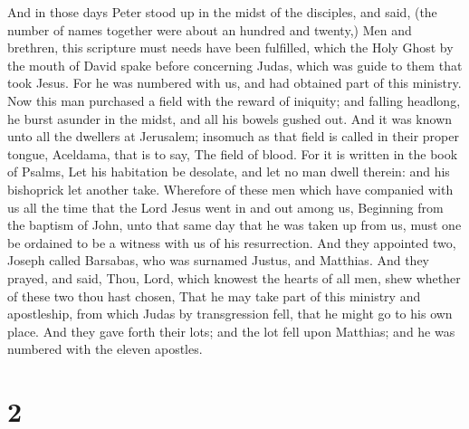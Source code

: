  And in those days Peter stood up in the midst of the
disciples, and said, (the number of names together were about an hundred
and twenty,)  Men and brethren, this scripture must needs
have been fulfilled, which the Holy Ghost by the mouth of David spake
before concerning Judas, which was guide to them that took Jesus.
 For he was numbered with us, and had obtained part of
this ministry.  Now this man purchased a field with the
reward of iniquity; and falling headlong, he burst asunder in the midst,
and all his bowels gushed out.  And it was known unto all
the dwellers at Jerusalem; insomuch as that field is called in their
proper tongue, Aceldama, that is to say, The field of blood.
 For it is written in the book of Psalms, Let his
habitation be desolate, and let no man dwell therein: and his bishoprick
let another take.  Wherefore of these men which have
companied with us all the time that the Lord Jesus went in and out among
us,  Beginning from the baptism of John, unto that same
day that he was taken up from us, must one be ordained to be a witness
with us of his resurrection.  And they appointed two,
Joseph called Barsabas, who was surnamed Justus, and Matthias.
 And they prayed, and said, Thou, Lord, which knowest the
hearts of all men, shew whether of these two thou hast chosen,
 That he may take part of this ministry and apostleship,
from which Judas by transgression fell, that he might go to his own
place.  And they gave forth their lots; and the lot fell
upon Matthias; and he was numbered with the eleven apostles.

\hypertarget{section-1}{%
\section{2}\label{section-1}}

